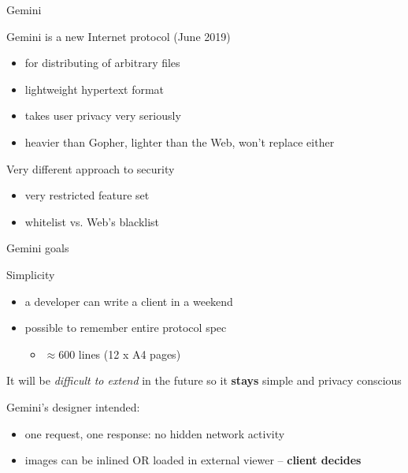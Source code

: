 \documentclass[presentation, 11pt,  aspectratio=169]{beamer}
\renewcommand{\alert}[1]{\textbf{\textcolor{mydarkred}{#1}}}
\begin{document}
\begin{frame}[label={sec:orgd7340ad}]{Gemini}
\begin{block}{Gemini is a new Internet protocol (June 2019)}
\begin{itemize}
\item for distributing of arbitrary files\\
\item lightweight hypertext format\\
\item takes user privacy very seriously\\
\item heavier than Gopher, lighter than the Web, won't replace either\\
\end{itemize}
\pause
\end{block}

\begin{block}{Very different approach to security}
\begin{itemize}
\item very restricted feature set\\
\item whitelist vs. Web's blacklist\\
\end{itemize}
\end{block}
\end{frame}

\begin{frame}[label={sec:org19b3c75}]{Gemini goals}
\begin{block}{Simplicity}
\begin{itemize}
\item a developer can write a client in a weekend\\
\item possible to remember entire protocol spec\\
\begin{itemize}
\item \(\approx\)600 lines (12 x A4 pages)\\
\end{itemize}
\end{itemize}
\end{block}

\begin{block}{It will be \emph{difficult to extend} in the future}
so it \alert{stays} simple and privacy conscious\\
\end{block}

\begin{block}{Gemini's designer intended:}
\begin{itemize}
\item one request, one response: no hidden network activity\\
\item images can be inlined OR loaded in external viewer -- \alert{client decides}\\
\end{itemize}
\end{block}
\end{frame}
\end{document}

